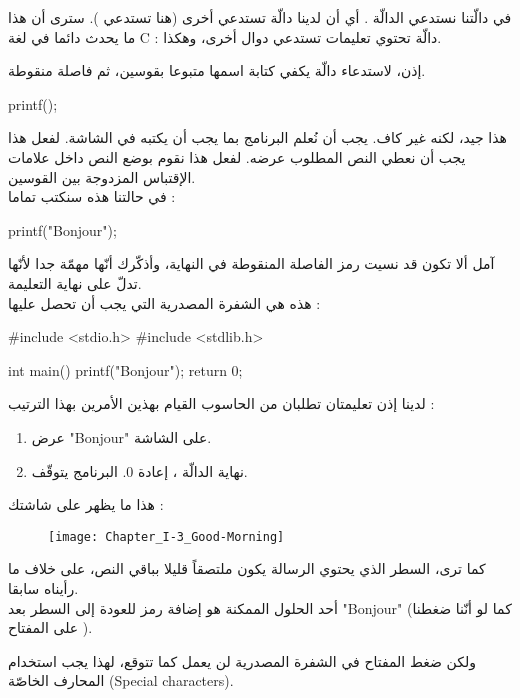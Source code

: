 في دالّتنا
نستدعي الدالّة
 .
 أي أن لدينا دالّة تستدعي أخرى (هنا
تستدعي
).
سترى أن هذا ما يحدث دائما في لغة
\textenglish{C}
: دالّة تحتوي تعليمات تستدعي دوال أخرى، وهكذا.

إذن، لاستدعاء دالّة يكفي كتابة اسمها متبوعا بقوسين، ثم فاصلة منقوطة.

\begin{Csource}
printf();
\end{Csource}

هذا جيد، لكنه غير كاف. يجب أن نُعلم البرنامج بما يجب أن يكتبه في الشاشة. لفعل هذا يجب أن نعطي
النص المطلوب عرضه. لفعل هذا نقوم بوضع النص داخل علامات الإقتباس المزدوجة بين القوسين.\\
في حالتنا هذه سنكتب تماما :

\begin{Csource}
printf("Bonjour");
\end{Csource}

آمل ألا تكون قد نسيت رمز الفاصلة المنقوطة في النهاية، وأذكّرك أنّها مهمّة جدا لأنّها تدلّ على نهاية التعليمة.\\
هذه هي الشفرة المصدرية التي يجب أن تحصل عليها :

\begin{Csource}
#include <stdio.h>
#include <stdlib.h>

int main()
{
    printf("Bonjour");
    return 0;
}
\end{Csource}

لدينا إذن تعليمتان تطلبان من الحاسوب القيام بهذين الأمرين بهذا الترتيب :
\begin{enumerate}
  \item عرض
"\textenglish{Bonjour}"
على الشاشة.
  \item نهاية الدالّة
، إعادة 0. البرنامج يتوقّف.
\end{enumerate}

هذا ما يظهر على شاشتك :

\begin{figure}[H]
	\centering
	\texttt{[image: Chapter\_I-3\_Good-Morning]}
\end{figure}

كما ترى، السطر الذي يحتوي الرسالة يكون ملتصقاً قليلا بباقي النص، على خلاف ما رأيناه سابقا.\\
أحد الحلول الممكنة هو إضافة رمز للعودة إلى السطر بعد
 "\textenglish{Bonjour}"
 (كما لو أنّنا ضغطنا على المفتاح
).

ولكن ضغط المفتاح
 في الشفرة المصدرية لن يعمل كما تتوقع، لهذا يجب استخدام المحارف الخاصّة
(\textenglish{Special characters}).

